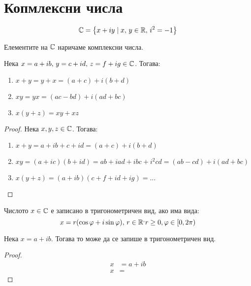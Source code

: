 \section{Копмлексни числа}

\begin{definition}
    \[\mathbb{C} = \left\{ x + iy \mid x,\,y \in \mathbb{R},\, i^2 = -1 \right\}\]

    Елементите на $\mathbb{C}$ наричаме комплексни числа.
\end{definition}

\begin{theorem}
    Нека $x = a+ib,\, y = c+id,\, z = f+ig \in \mathbb{C}$. Тогава:
    \begin{enumerate}
        \item $x + y = y + x = (a+c) + i(b+d)$
        \item $xy = yx = (ac - bd) + i(ad + bc)$
        \item $x(y + z) = xy + xz$
    \end{enumerate}

    \begin{proof}
        Нека $x, y, z \in \mathbb{C}$. Тогава:
        \begin{enumerate}
            \item $x + y = a + ib + c + id = (a + c) + i(b + d)$
            \item $xy = (a+ic)(b+id) = ab + iad + ibc + i^2cd = (ab - cd) + i(ad + bc)$
            \item $x(y + z) = (a + ib)(c + f + id + ig) = ...$
        \end{enumerate}
    \end{proof}
\end{theorem}

\begin{definition}
    Числото $x \in \mathbb{C}$ е записано в тригонометричен вид, ако има вида:
    \[x = r(\cos\varphi + i\sin\varphi),\, r \in \mathbb{R}^, r \geq 0, \varphi \in \left[0,2\pi\right)\]
\end{definition}

\begin{lem}
    Нека $x = a+ib$. Тогава то може да се запише в тригонометричен вид.
    \begin{proof}
        \begin{align*}
            x &= a + ib \\
            x &= 
        \end{align*}
    \end{proof}
\end{lem}

